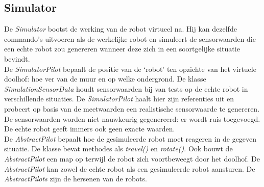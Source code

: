 \documentclass[tt2]{penoverslag}
\begin{document}
%
%

\subsection{Simulator}
\label{ssec:Sim}
De \textit{Simulator} bootst de werking van de robot virtueel na. Hij kan dezelfde commando's uitvoeren als de werkelijke robot en simuleert de sensorwaarden die een echte robot zou genereren wanneer deze zich in een soortgelijke situatie bevindt.\\

De \textit{SimulatorPilot} bepaalt de positie van de `robot' ten opzichte van het virtuele doolhof: hoe ver van de muur en op welke ondergrond. De klasse \textit{SimulationSensorData} houdt sensorwaarden bij van tests op de echte robot in verschillende situaties. De \textit{SimulatorPilot} haalt hier zijn referenties uit en probeert op basis van de meetwaarden een realistische sensorwaarde te genereren. De sensorwaarden worden niet nauwkeurig gegenereerd: er wordt ruis toegevoegd. De echte robot geeft immers ook geen exacte waarden.\\

De \textit{AbstractPilot} bepaalt hoe de gesimuleerde robot moet reageren in de gegeven situatie. De klasse bevat methodes als \textit{travel()} en \textit{rotate()}. Ook bouwt de \textit{AbstractPilot} een map op terwijl de robot zich voortbeweegt door het doolhof. De \textit{AbstractPilot} kan zowel de echte robot als een gesimuleerde robot aansturen. De \textit{AbstractPilots} zijn de hersenen van de robots.
\end{document}

